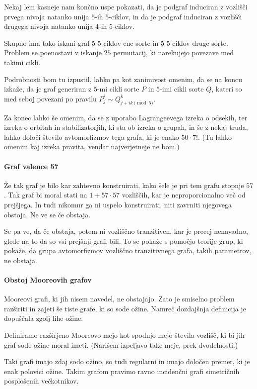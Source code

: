 \documentclass{fmfkpb}
\begin{document}
Nekaj lem kasneje nam končno uspe pokazati, da je podgraf induciran z 
vozlišči prvega nivoja natanko unija $5$-ih $5$-ciklov, in da je
podgraf induciran z vozlišči drugega nivoja natanko unija $4$-ih $5$-ciklov.

Skupno ima tako iskani graf $5$ $5$-ciklov ene sorte in $5$ $5$-ciklov druge sorte.
Problem se poenostavi v iskanje $25$ permutacij, ki narekujejo povezave med 
takimi cikli.

Podrobnosti bom tu izpustil, lahko pa kot zanimivost omenim, da se na koncu
izkaže, da je graf generiran z $5$-mi cikli sorte $P$ in 
$5$-imi cikli sorte $Q$, kateri so med seboj 
povezani po pravilu $P^i_j \sim Q^k_{j + ik \pmod 5}$.

Za konec lahko še omenim, da se z uporabo Lagrangeevega izreka o odsekih,
ter izreka o orbitah in stabilizatorjih, ki sta ob izreka o grupah,
in še z nekaj truda, lahko določi število avtomorfizmov tega grafa,
ki je enako $50\cdot 7!$.
(Tu lahko omenim kaj izreka pravita, vendar najverjetneje ne bom.)

\paragraph{Graf valence 57}
Že tak graf je bilo kar zahtevno konstruirati, kako šele je pri tem grafu 
stopnje $57$. Tak graf bi moral stati na $1 +57\cdot 57$ vozliščih, kar je
neproporcionalno več od prejšjega. In tudi nikomur ga ni uspelo konstruirati,
niti zavrniti njegovega obstoja. Ne ve se če obstaja.

Se pa ve, da če obstaja, potem ni vozliščno tranzitiven, kar je precej nenavadno, 
glede na to da so vsi prejšnji grafi bili.
To se pokaže s pomočjo teorije grup, ki pokaže, da grupa avtomorfizmov 
vozliščno tranzitivnega grafa, takih parametrov, ne obstaja.

\paragraph{Obstoj Mooreovih grafov}
Mooreovi grafi, ki jih nisem navedel, ne obstajajo. Zato je smiselno problem 
razširiti in zajeti še tiste grafe, ki so sode ožine. Namreč dozdajšnja definicija
je dopuščala zgolj lihe ožine.

Definiramo razširjeno Mooreovo mejo kot spodnjo mejo števila vozlišč, ki bi jih
graf sode ožine moral imeti. (Narišem izpeljavo take meje, prek dvodelnosti.)

Taki grafi imajo zdaj sodo ožino, so tudi regularni in imajo določen premer, ki je 
enak polovici ožine. Takim grafom pravimo ravno incidenčni grafi simetričnih 
posplošenih večkotnikov.
\end{document}
